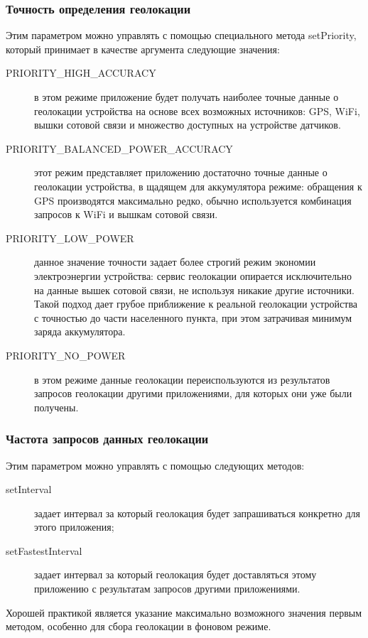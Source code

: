\subsubsection*{Точность определения геолокации}
Этим параметром можно управлять с помощью специального метода setPriority, который принимает в качестве аргумента следующие значения:
\begin{description}
	\item[PRIORITY\_HIGH\_ACCURACY] в этом режиме приложение будет получать наиболее точные данные о геолокации устройства на основе всех возможных источников: GPS, WiFi, вышки сотовой связи и множество доступных на устройстве датчиков.
	\item[PRIORITY\_BALANCED\_POWER\_ACCURACY] этот режим представляет приложению достаточно точные данные о геолокации устройства, в щадящем для аккумулятора режиме: обращения к GPS производятся максимально редко, обычно используется комбинация запросов к WiFi и вышкам сотовой связи.
	\item[PRIORITY\_LOW\_POWER] данное значение точности задает более строгий режим экономии электроэнергии устройства: сервис геолокации опирается исключительно на данные вышек сотовой связи, не используя никакие другие источники. Такой подход дает грубое приближение к реальной геолокации устройства с точностью до части населенного пункта, при этом затрачивая минимум заряда аккумулятора.
	\item[PRIORITY\_NO\_POWER] в этом режиме данные геолокации переиспользуются из результатов запросов геолокации другими приложениями, для которых они уже были получены.
\end{description}


\subsubsection*{Частота запросов данных геолокации}
Этим параметром можно управлять с помощью следующих методов:
\begin{description}
	\item[setInterval] задает интервал за который геолокация будет запрашиваться конкретно для этого приложения;
	\item[setFastestInterval] задает интервал за который геолокация будет доставляться этому приложению с результатам запросов другими приложениями.
\end{description}
Хорошей практикой является указание максимально возможного значения первым методом, особенно для сбора геолокации в фоновом режиме.


